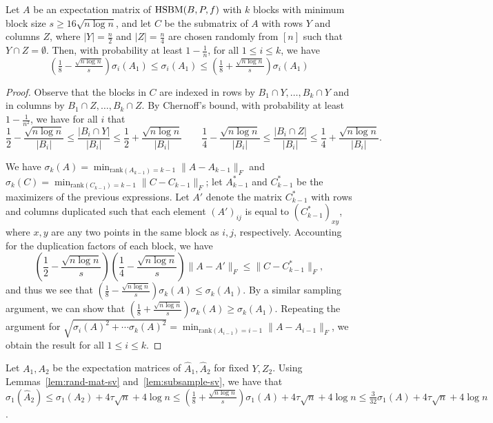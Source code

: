 \begin{lem}\label{lem:subsample-sv}
Let $A$ be an expectation matrix of $\textnormal{HSBM}(B,P,f)$ with $k$ blocks with minimum block size $s \geq 16\sqrt{n \log n}$, and let $C$ be the submatrix of $A$ with rows $Y$ and columns $Z$, where $|Y| = \frac{n}{2}$ and $|Z| = \frac{n}{4}$ are chosen randomly from $[n]$ such that $Y \cap Z = \emptyset$. Then, with probability at least $1-\frac{1}{n}$, for all $1 \leq i \leq k$, we have
\[
(\tfrac 1 8 - \tfrac{\sqrt{n \log n}} s)\sigma_i(A_1) \leq \sigma_i(A_1) \leq (\tfrac 1 8 + \tfrac{\sqrt{n \log n}} s)\sigma_i(A_1)
\]
\end{lem}
\begin{proof}
Observe that the blocks in $C$ are indexed in rows by $B_1 \cap Y, \ldots, B_k \cap Y$ and in columns by $B_1 \cap Z, \ldots, B_k \cap Z$. By Chernoff's bound, with probability at least $1 - \frac{1}{n^2}$, we have for all $i$ that
\[
    \frac{1}{2} - \frac{\sqrt{n \log n}}{|B_i|} \leq \frac{|B_i \cap Y|}{|B_i|} \leq \frac{1}{2} + \frac{\sqrt{n \log n}}{|B_i|} \ \ \ \ \ \ \ \ \ \frac 1 4 - \frac{\sqrt{n \log n}}{|B_i|} \leq \frac{|B_i \cap Z|}{|B_i|} \leq \frac 1 4 + \frac{\sqrt{n \log n}}{|B_i|}.
\]

We have $\sigma_{k}(A) = \min_{\text{rank}(A_{k-1}) = k-1} \|A - A_{k-1}\|_F$ and $\sigma_{k}(C) = \min_{\text{rank}(C_{k-1}) = k-1} \|C-C_{k-1}\|_F$; let $A_{k-1}^*$ and $C_{k-1}^*$ be the maximizers of the previous expressions. Let $A'$ denote the matrix $C_{k-1}^*$ with rows and columns duplicated such that each element $(A')_{ij}$ is equal to $(C_{k-1}^*)_{xy}$, where $x,y$ are any two points in the same block as $i,j$, respectively. Accounting for the duplication factors of each block, we have
\[
    \left(\frac 1 2 - \frac{\sqrt{n \log n}}{s}\right)\left(\frac 1 4 - \frac{\sqrt{n \log n}}{s}\right)\|A - A'\|_F \leq  \|C - C_{k-1}^*\|_F,
\]
and thus we see that $(\frac 1 8 - \frac{\sqrt{n \log n}}{s})\sigma_k(A) \leq \sigma_k(A_1)$. By a similar sampling argument, we can show that $(\frac 1 8 + \frac{\sqrt{n \log n}}{s})\sigma_k(A) \geq \sigma_k(A_1)$. Repeating the argument for $\sqrt{\sigma_{i}(A)^2 + \cdots \sigma_{k}(A)^2} = \min_{\text{rank}(A_{i-1})=i-1}\|A - A_{i-1}\|_F$, we obtain the result for all $1 \leq i \leq k$.
\end{proof}
Let $A_1, A_2$ be the expectation matrices of $\hat{A}_1, \hat{A}_2$ for fixed $Y,Z_2$. Using Lemmas~\ref{lem:rand-mat-sv} and~\ref{lem:subsample-sv}, we have that $\sigma_{1}(\hat{A}_2) \leq \sigma_1(A_2) + 4\tau \sqrt{n} + 4 \log n \leq (\frac{1}{8} + \frac{\sqrt{n \log n}}{s})\sigma_1(A) + 4\tau \sqrt{n} + 4 \log n \leq \frac{3}{32} \sigma_1(A) + 4\tau \sqrt{n} + 4 \log n$.
